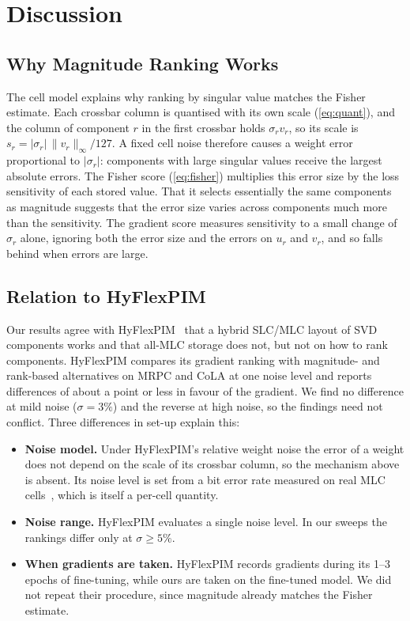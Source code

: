 \section{Discussion}\label{sec:discussion}

\subsection{Why Magnitude Ranking Works}
The cell model explains why ranking by singular value matches the Fisher estimate. Each crossbar column is
quantised with its own scale (\cref{eq:quant}), and the column of component $r$ in the first crossbar holds
$\sigma_r v_r$, so its scale is $s_r=|\sigma_r|\,\|v_r\|_\infty/127$. A fixed cell noise therefore causes a weight error
proportional to $|\sigma_r|$: components with large singular values receive the largest absolute errors.
The Fisher score (\cref{eq:fisher}) multiplies this error size by the loss sensitivity of each stored value.
That it selects essentially the same components as magnitude suggests that the error size varies across
components much more than the sensitivity. The gradient score measures sensitivity to a small change of
$\sigma_r$ alone, ignoring both the error size and the errors on $u_r$ and $v_r$, and so falls behind when
errors are large.

\subsection{Relation to HyFlexPIM}
Our results agree with HyFlexPIM~\cite{song2025hyflexpim} that a hybrid SLC/MLC layout of SVD components
works and that all-MLC storage does not, but not on how to rank components. HyFlexPIM compares its
gradient ranking with magnitude- and rank-based alternatives on MRPC and CoLA at one noise level and reports
differences of about a point or less in favour of the gradient. We find no difference at mild noise
($\sigma=3\%$) and the reverse at high noise, so the findings need not conflict. Three differences in
set-up explain this:
\begin{itemize}
\item \textbf{Noise model.} Under HyFlexPIM's relative weight noise the error of a weight does not depend on
the scale of its crossbar column, so the mechanism above is absent. Its noise level is set from a bit error
rate measured on real MLC cells~\cite{fan2024mlc}, which is itself a per-cell quantity.
\item \textbf{Noise range.} HyFlexPIM evaluates a single noise level. In our sweeps the rankings differ
only at $\sigma\geq5\%$.
\item \textbf{When gradients are taken.} HyFlexPIM records gradients during its 1--3 epochs of
fine-tuning, while ours are taken on the fine-tuned model. We did not repeat their procedure, since magnitude
already matches the Fisher estimate.
\end{itemize}

